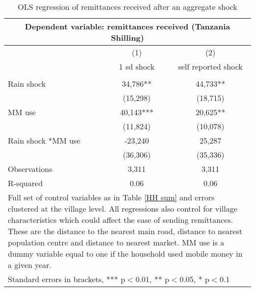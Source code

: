 \begin{table}
\centering 
\caption{OLS regression of remittances received after an aggregate shock} \label{remittance}
\begin{tabular}{lcc}
\multicolumn{3}{c}{Dependent variable: remittances received (Tanzania Shilling)} \\ \hline
 & (1) & (2)  \\
  & 1 sd shock & self reported shock \\ \hline
  &  &   \\
Rain shock & 34,786** & 44,733**  \\
 & (15,298) & (18,715) \\
MM use & 40,143*** & 20,625** \\
 & (11,824) & (10,078) \\
Rain shock *MM use & -23,240 & 25,287  \\
 & (36,306) & (35,336)  \\
Observations & 3,311 & 3,311  \\
R-squared & 0.06 & 0.06 \\ \hline
\multicolumn{3}{p{11cm}}{Full set of control variables as in Table \ref{HH sum} and errors clustered at the village level. All regressions also control for village characteristics which could affect the ease of sending remittances. These are the distance to the nearest main road, distance to nearest population centre and distance to nearest market. MM use is a dummy variable equal to one if the household used mobile money in a given year.} \\
\multicolumn{3}{l}{ Standard errors in brackets, *** p$<$0.01, ** p$<$0.05, * p$<$0.1} \\
\end{tabular}
\end{table}